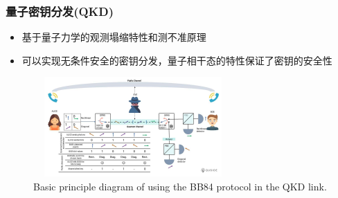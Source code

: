\begin{frame}
	\frametitle{量子密钥分发\textrm{(QKD)}}
    \begin{itemize}
        \item 基于量子力学的观测塌缩特性和测不准原理
        \item 可以实现无条件安全的密钥分发，量子相干态的特性保证了密钥的安全性
    \end{itemize}
    \begin{figure}
        \centering
                \includegraphics[height=1.5in, width=3.0in, viewport=0 0 1280 720,clip]{Figures/Quantum_Communication-QKD_infografia.jpeg}
		\caption{\tiny{\textrm{Basic principle diagram of using the BB84 protocol in the QKD link.}}}
		\label{Fig:Basic-principle_diagram-of-using-the-BB84_protocol-in-the-QKD-link}
    \end{figure}
\vskip -10pt
{\fontsize{7.5pt}{5.2pt}}
\end{frame}

